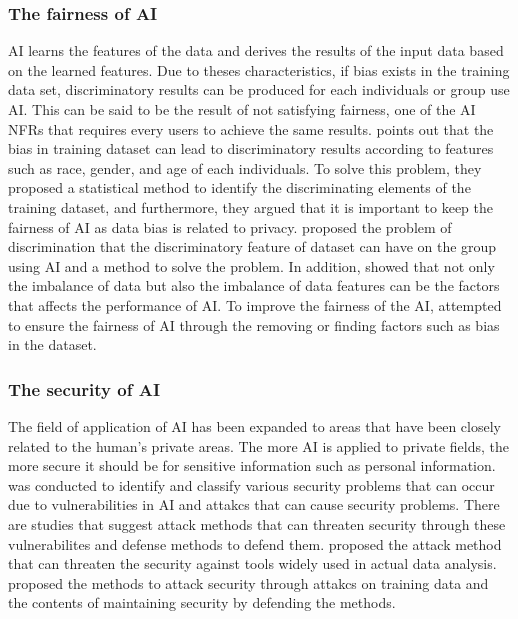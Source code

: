 \documentclass[journal,article,submit,moreauthors,pdftex]{Definitions/mdpi}
\begin{document}
\subsubsection{The fairness of AI}

AI learns the features of the data and derives the results of the input data based on the learned features.
Due to theses characteristics, if bias exists in the training data set, discriminatory results can be produced for each individuals or group use AI.
This can be said to be the result of not satisfying fairness, one of the AI NFRs that requires every users to achieve the same results.
\cite{fairness-dwork, fairness-zemel} points out that the bias in training dataset can lead to discriminatory results according to features such as race, gender, and age of each individuals.
To solve this problem, they proposed a statistical method to identify the discriminating elements of the training dataset, and furthermore, they argued that it is important to keep the fairness of AI as data bias is related to privacy.
\cite{fairness-feldman} proposed the problem of discrimination that the discriminatory feature of dataset can have on the group using AI and a method to solve the problem.
In addition, \cite{fairness-zhang} showed that not only the imbalance of data but also the imbalance of data features can be the factors that affects the performance of AI.
To improve the fairness of the AI, \cite{fairness-feldman,fairness-microsoft, fairness-tramer} attempted to ensure the fairness of AI through the removing or finding factors such as bias in the dataset.

\subsubsection{The security of AI}

The field of application of AI has been expanded to areas that have been closely related to the human's private areas.
The more AI is applied to private fields, the more secure it should be for sensitive information such as personal information.
\cite{security-barreno} was conducted to identify and classify various security problems that can occur due to vulnerabilities in AI and attakcs that can cause security problems.
There are studies that suggest attack methods that can threaten security through these vulnerabilites and defense methods to defend them.
\cite{security-mei2} proposed the attack method that can threaten the security against tools widely used in actual data analysis.
\cite{security-mei} proposed the methods to attack security through attakcs on training data and the contents of maintaining security by defending the methods.
\end{document}
